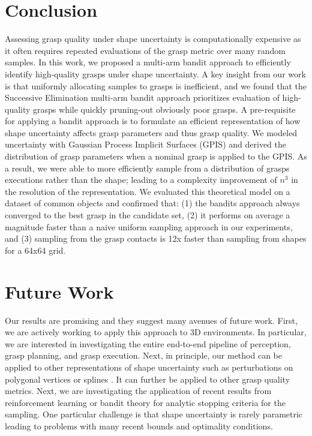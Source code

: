 \documentclass[letterpaper, 10 pt, conference]{ieeeconf}  %
\begin{document}
\section{Conclusion}
Assessing grasp quality under shape uncertainty is computationally expensive as it often requires repeated evaluations of the grasp metric over many random samples.
In this work, we proposed a multi-arm bandit approach to efficiently identify high-quality grasps under shape uncertainty. 
A key insight from our work is that uniformly allocating samples to grasps is inefficient, and
 we found that the Successive Elimination multi-arm bandit approach prioritizes evaluation of high-quality grasps while quickly pruning-out obviously poor grasps.
A pre-requisite for applying a bandit approach is to formulate an efficient representation of how shape uncertainty affects grasp parameters and thus grasp quality.
We modeled uncertainty with Gaussian Process Implicit Surfaces (GPIS) and derived the distribution of grasp parameters when a nominal grasp is applied to the GPIS.
As a result, we were able to more efficiently sample from a distribution of grasps executions rather than the shape; leading to a complexity improvement of $n^3$ in the resolution of the representation.
We evaluated this theoretical model on a dataset of common objects and confirmed that: (1) the bandits approach always converged to the best grasp in the candidate set, (2) it performs on average a magnitude faster than a naive uniform sampling approach in our experiments, and (3) sampling from the grasp contacts is 12x faster than sampling from shapes for a 64x64 grid.



\section{Future Work}
Our results are promising and they suggest many avenues of future work.
First, we are actively working to apply this approach to 3D environments.
In particular, we are interested in investigating the entire end-to-end pipeline of perception, grasp planning, and grasp execution.
Next, in principle, our method can be applied to other representations of shape uncertainty such as perturbations on polygonal vertices \cite{kehoe2012estimating} or splines \cite{christopoulos2007handling}.
It can further be applied to other grasp quality metrics.
Next, we are investigating the application of recent results from reinforcement learning or bandit theory for analytic stopping criteria for the sampling.
One particular challenge is that shape uncertainty is rarely parametric leading to problems with many recent bounds and optimality conditions.





\end{document}
